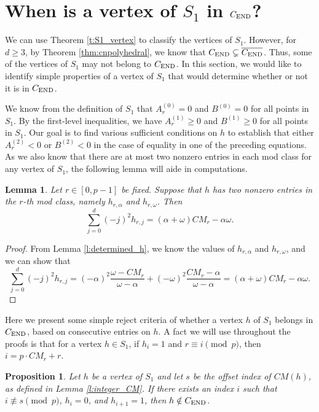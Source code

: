 \documentclass[12pt]{amsart}
\newtheorem{lemma}[thm]{Lemma}
\newtheorem{prop}[thm]{Proposition}
\theoremstyle{definition}
\numberwithin{equation}{section}
\renewcommand\>{\rangle}
\newcommand\<{\langle}
\newcommand\0{\mathbf{0}}
\newcommand{\CEND}{C_\textnormal{END}}
\begin{document}
\section{When is a vertex of $S_1$ in $\CEND$?}\label{sec:sufficiency}

We can use Theorem \ref{t:S1_vertex} to classify the vertices of $S_1$.
However, for $d \geq 3$, by Theorem \ref{thm:cnpolyhedral}, we know that $\CEND \subsetneq \overline{\CEND}$. 
Thus, some of the vertices of $S_1$ may not belong to $\CEND$. 
In this section, we would like to identify simple properties of a vertex of $S_1$ that would determine whether or not it is in $\CEND$.
 
We know from the definition of $S_1$ that $A_r^{(0)} = 0$ and $B^{(0)} = 0$ for all points in $S_1$.
By the first-level inequalities, we have $A_r^{(1)} \geq 0 $ and $B^{(1)} \geq 0$ for all points in $S_1$. 
Our goal is to find various sufficient conditions on $h$ to establish that either $A_r^{(2)} < 0$ or $B^{(2)} < 0$ in the case of equality in one of the preceding equations.
As we also know that there are at most two nonzero entries in each mod class for any vertex of $S_1$, the following lemma will aide in computations.

\begin{lemma}\label{l:A2_computation}
	Let $r \in [0,p-1]$ be fixed. Suppose that $h$ has two nonzero entries in the $r$-th mod class, namely $h_{r,\alpha}$ and $h_{r,\omega}$. Then 
	\[\sum_{j=0}^d (-j)^2 h_{r,j} = (\alpha+\omega)CM_r - \alpha\omega.\]
\end{lemma}

\begin{proof}
	From Lemma \ref{l:determined_h}, we know the values of $h_{r,\alpha}$ and $h_{r,\omega}$, and we can show that
	\[ \sum_{j=0}^d (-j)^2 h_{r,j} = (-\alpha)^2 \frac{\omega - CM_r}{\omega - \alpha} + (-\omega)^2 \frac{CM_r - \alpha}{\omega-\alpha} = (\alpha+\omega)CM_r - \alpha\omega.\]
\end{proof}


Here we present some simple reject criteria of whether a vertex $h$ of $S_1$ belongs in $\CEND$, based on consecutive entries on $h$. A fact we will use throughout the proofs is that for a vertex $h \in S_1$, if $h_i = 1$ and $r \equiv i \pmod p$, then $i = p \cdot CM_{r} + r$.

\begin{prop}\label{p:END_01_check}
	Let $h$ be a vertex of $S_1$ and let $s$ be the offset index of $CM(h)$, as defined in Lemma \ref{l:integer_CM}. If there exists an index $i$ such that $i \not\equiv s \pmod p$, $h_{i} = 0$, and $h_{i+1} = 1$, then $h \notin \CEND$.
\end{prop}
\end{document}
